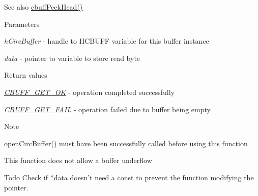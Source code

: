 \begin{DoxySeeAlso}{See also}
\hyperlink{group___c_b_u_f_fpeek_buffer_functions_ga52d817b014ba86d30009afd4197392bf}{cbuffPeekHead()}
\end{DoxySeeAlso}

\begin{DoxyParams}{Parameters}
\item[{\em hCircBuffer}]-\/ handle to HCBUFF variable for this buffer instance \item[{\em data}]-\/ pointer to variable to store read byte\end{DoxyParams}

\begin{DoxyRetVals}{Return values}
\item[{\em \hyperlink{cbuff_8h_aed4d79f9c31ace44bb97266e341efa3c}{CBUFF\_\-GET\_\-OK}}]-\/ operation completed successfully \item[{\em \hyperlink{cbuff_8h_ad66419f570e592a335226a552a13fea6}{CBUFF\_\-GET\_\-FAIL}}]-\/ operation failed due to buffer being empty\end{DoxyRetVals}
\begin{DoxyNote}{Note}

\begin{DoxyEnumerate}
\item openCircBuffer() must have been successfully called before using this function
\item This function does not allow a buffer underflow
\end{DoxyEnumerate}
\end{DoxyNote}
\begin{Desc}
\item[\hyperlink{todo__todo000003}{Todo}]Check if $\ast$data doesn't need a const to prevent the function modifying the pointer. \end{Desc}

